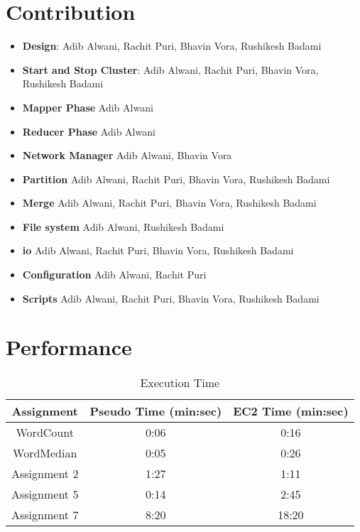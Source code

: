 \documentclass{article}
\begin{document}
\section{Contribution}

\begin{itemize}
    \item \textbf{Design}: Adib Alwani, Rachit Puri, Bhavin Vora, Rushikesh Badami
    \item \textbf{Start and Stop Cluster}: Adib Alwani, Rachit Puri, Bhavin Vora, Rushikesh Badami
    \item \textbf{Mapper Phase} Adib Alwani
    \item \textbf{Reducer Phase} Adib Alwani
    \item \textbf{Network Manager} Adib Alwani, Bhavin Vora
    \item \textbf{Partition} Adib Alwani, Rachit Puri, Bhavin Vora, Rushikesh Badami
    \item \textbf{Merge} Adib Alwani, Rachit Puri, Bhavin Vora, Rushikesh Badami
    \item \textbf{File system} Adib Alwani, Rushikesh Badami
    \item \textbf{io} Adib Alwani, Rachit Puri, Bhavin Vora, Rushikesh Badami
    \item \textbf{Configuration} Adib Alwani, Rachit Puri
    \item \textbf{Scripts} Adib Alwani, Rachit Puri, Bhavin Vora, Rushikesh Badami
\end{itemize}

\section{Performance}

\begin{table}[ht]
    \caption{Execution Time}
    \centering
    \begin{tabular}{c|c|c}
    \hline \hline
    Assignment & Pseudo Time (min:sec) & EC2 Time (min:sec)\\
    \hline
    WordCount & 0:06 & 0:16\\
    WordMedian & 0:05 & 0:26\\
    Assignment 2 & 1:27 & 1:11\\
    Assignment 5 & 0:14 & 2:45\\
    Assignment 7 & 8:20 & 18:20\\
    \hline
    \end{tabular}
\end{table}
\end{document}
